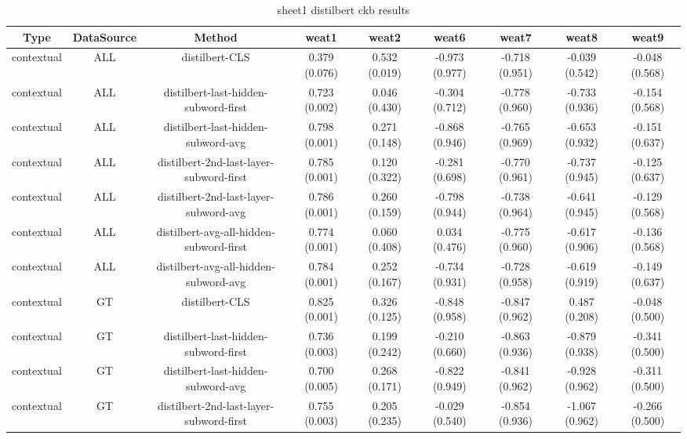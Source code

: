 \begin{sidewaystable}[htb]
    \centering
    \caption{sheet1 distilbert ckb results}
    \label{appendix_tab:sheet1_distilbert_ckb_results}
    \small
    \begin{tabular}{@{}ccccccccc@{}}
        \toprule
        Type & DataSource & Method & weat1 & weat2 & weat6 & weat7 & weat8 & weat9 \\
        \midrule
        contextual & ALL & distilbert-CLS & 0.379 (0.076) & 0.532 (0.019) & -0.973 (0.977) & -0.718 (0.951) & -0.039 (0.542) & -0.048 (0.568) \\
        contextual & ALL & distilbert-last-hidden-subword-first & 0.723 (0.002) & 0.046 (0.430) & -0.304 (0.712) & -0.778 (0.960) & -0.733 (0.936) & -0.154 (0.568) \\
        contextual & ALL & distilbert-last-hidden-subword-avg & 0.798 (0.001) & 0.271 (0.148) & -0.868 (0.946) & -0.765 (0.969) & -0.653 (0.932) & -0.151 (0.637) \\
        contextual & ALL & distilbert-2nd-last-layer-subword-first & 0.785 (0.001) & 0.120 (0.322) & -0.281 (0.698) & -0.770 (0.961) & -0.737 (0.945) & -0.125 (0.637) \\
        contextual & ALL & distilbert-2nd-last-layer-subword-avg & 0.786 (0.001) & 0.260 (0.159) & -0.798 (0.944) & -0.738 (0.964) & -0.641 (0.945) & -0.129 (0.568) \\
        contextual & ALL & distilbert-avg-all-hidden-subword-first & 0.774 (0.001) & 0.060 (0.408) & 0.034 (0.476) & -0.775 (0.960) & -0.617 (0.906) & -0.136 (0.568) \\
        contextual & ALL & distilbert-avg-all-hidden-subword-avg & 0.784 (0.001) & 0.252 (0.167) & -0.734 (0.931) & -0.728 (0.958) & -0.619 (0.919) & -0.149 (0.637) \\
        contextual & GT & distilbert-CLS & 0.825 (0.001) & 0.326 (0.125) & -0.848 (0.958) & -0.847 (0.962) & 0.487 (0.208) & -0.048 (0.500) \\
        contextual & GT & distilbert-last-hidden-subword-first & 0.736 (0.003) & 0.199 (0.242) & -0.210 (0.660) & -0.863 (0.936) & -0.879 (0.938) & -0.341 (0.500) \\
        contextual & GT & distilbert-last-hidden-subword-avg & 0.700 (0.005) & 0.268 (0.171) & -0.822 (0.949) & -0.841 (0.962) & -0.928 (0.962) & -0.311 (0.500) \\
        contextual & GT & distilbert-2nd-last-layer-subword-first & 0.755 (0.003) & 0.205 (0.235) & -0.029 (0.540) & -0.854 (0.936) & -1.067 (0.962) & -0.266 (0.500) \\

\end{tabular}
\end{sidewaystable}
